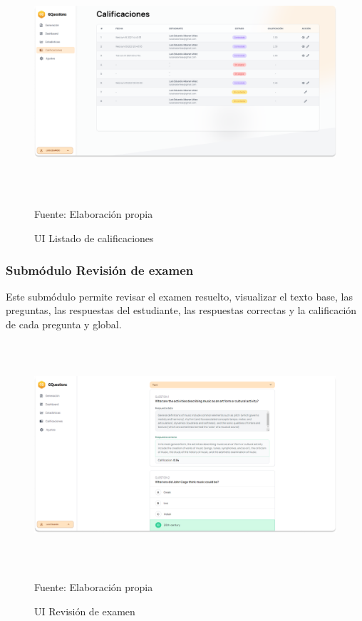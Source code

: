\documentclass[../Main.tex]{subfiles}
\begin{document}
    \begin{figure}[H]
	\begin{Center}
		\includegraphics[width=6.4in,height=3.3in]{Images/ui_docente_listado_calificaciones.png}
	    \caption{UI Listado de calificaciones}
	    Fuente: Elaboración propia
        \label{fig:section}
	\end{Center}
    \end{figure}
    
    \subsubsection{Submódulo Revisión de examen}
    \begin{justify}
    Este submódulo permite revisar el examen resuelto, visualizar el texto base, las preguntas, las respuestas del estudiante, las respuestas correctas y la calificación de cada pregunta y global.
    \end{justify}

    \begin{figure}[H]
	\begin{Center}
		\includegraphics[width=6.4in,height=3.3in]{Images/ui_revision_examen.png}
	    \caption{UI Revisión de examen}
	    Fuente: Elaboración propia
        \label{fig:section}
	\end{Center}
    \end{figure}
    
\end{document}
